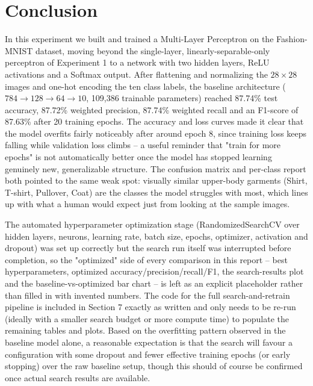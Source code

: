 \documentclass[11pt]{article}
\begin{document}
\section{Conclusion}
In this experiment we built and trained a Multi-Layer Perceptron on the Fashion-MNIST dataset, moving beyond the single-layer, linearly-separable-only perceptron of Experiment 1 to a network with two hidden layers, ReLU activations and a Softmax output. After flattening and normalizing the $28 \times 28$ images and one-hot encoding the ten class labels, the baseline architecture ($784 \rightarrow 128 \rightarrow 64 \rightarrow 10$, 109,386 trainable parameters) reached 87.74\% test accuracy, 87.72\% weighted precision, 87.74\% weighted recall and an F1-score of 87.63\% after 20 training epochs. The accuracy and loss curves made it clear that the model overfits fairly noticeably after around epoch 8, since training loss keeps falling while validation loss climbs -- a useful reminder that "train for more epochs" is not automatically better once the model has stopped learning genuinely new, generalizable structure. The confusion matrix and per-class report both pointed to the same weak spot: visually similar upper-body garments (Shirt, T-shirt, Pullover, Coat) are the classes the model struggles with most, which lines up with what a human would expect just from looking at the sample images.

The automated hyperparameter optimization stage (RandomizedSearchCV over hidden layers, neurons, learning rate, batch size, epochs, optimizer, activation and dropout) was set up correctly but the search run itself was interrupted before completion, so the "optimized" side of every comparison in this report -- best hyperparameters, optimized accuracy/precision/recall/F1, the search-results plot and the baseline-vs-optimized bar chart -- is left as an explicit placeholder rather than filled in with invented numbers. The code for the full search-and-retrain pipeline is included in Section 7 exactly as written and only needs to be re-run (ideally with a smaller search budget or more compute time) to populate the remaining tables and plots. Based on the overfitting pattern observed in the baseline model alone, a reasonable expectation is that the search will favour a configuration with some dropout and fewer effective training epochs (or early stopping) over the raw baseline setup, though this should of course be confirmed once actual search results are available.

\end{document}
